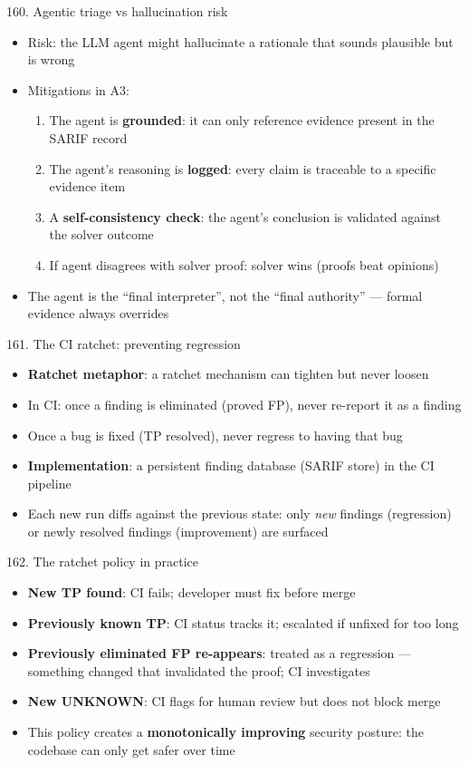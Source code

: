 \documentclass[aspectratio=169]{beamer}
\begin{document}
\begin{frame}{160. Agentic triage vs hallucination risk}
\begin{itemize}
  \item Risk: the LLM agent might hallucinate a rationale that sounds plausible but is wrong
  \item Mitigations in A3:
    \begin{enumerate}
      \item The agent is \textbf{grounded}: it can only reference evidence present in the SARIF record
      \item The agent's reasoning is \textbf{logged}: every claim is traceable to a specific evidence item
      \item A \textbf{self-consistency check}: the agent's conclusion is validated against the solver outcome
      \item If agent disagrees with solver proof: solver wins (proofs beat opinions)
    \end{enumerate}
  \item The agent is the ``final interpreter'', not the ``final authority'' --- formal evidence always overrides
\end{itemize}
\end{frame}

\begin{frame}{161. The CI ratchet: preventing regression}
\begin{itemize}
  \item \textbf{Ratchet metaphor}: a ratchet mechanism can tighten but never loosen
  \item In CI: once a finding is eliminated (proved FP), never re-report it as a finding
  \item Once a bug is fixed (TP resolved), never regress to having that bug
  \item \textbf{Implementation}: a persistent finding database (SARIF store) in the CI pipeline
  \item Each new run diffs against the previous state: only \emph{new} findings (regression) or newly resolved findings (improvement) are surfaced
\end{itemize}
\end{frame}

\begin{frame}{162. The ratchet policy in practice}
\begin{itemize}
  \item \textbf{New TP found}: CI fails; developer must fix before merge
  \item \textbf{Previously known TP}: CI status tracks it; escalated if unfixed for too long
  \item \textbf{Previously eliminated FP re-appears}: treated as a regression --- something changed that invalidated the proof; CI investigates
  \item \textbf{New UNKNOWN}: CI flags for human review but does not block merge
  \item This policy creates a \textbf{monotonically improving} security posture: the codebase can only get safer over time
\end{itemize}
\end{frame}
\end{document}
